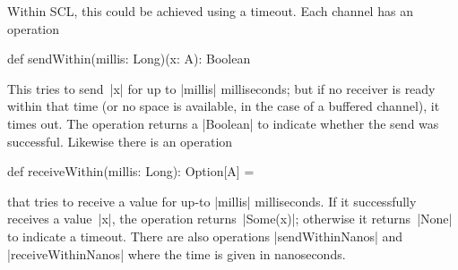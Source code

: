 Within SCL, this could be achieved using a timeout.  Each channel has an
operation
%
\begin{scala}
  def sendWithin(millis: Long)(x: A): Boolean 
\end{scala}
%
This tries to send~|x| for up to |millis| milliseconds; but if no receiver is
ready within that time (or no space is available, in the case of a buffered
channel), it times out.  The operation returns a |Boolean| to indicate whether
the send was successful.  Likewise there is an operation
%
\begin{scala}
  def receiveWithin(millis: Long): Option[A] =
\end{scala}
%
that tries to receive a value for up-to |millis| milliseconds.  If it
successfully receives a value~|x|, the operation returns~|Some(x)|; otherwise
it returns~|None| to indicate a timeout.  There are also operations
|sendWithinNanos| and |receiveWithinNanos| where the time is given in
nanoseconds.
